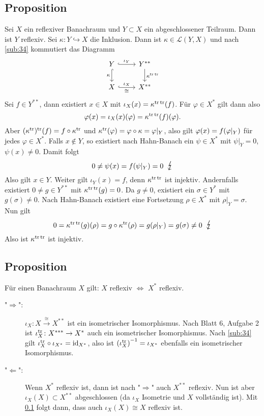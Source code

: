 \subsection[Proposition: Abgeschlossene Unterräume von reflexiven Banachräumen sind reflexiv]{Proposition} %
\label{sub:514}
Sei $X$ ein reflexiver Banachraum und $Y \subset X$ ein abgeschlossener Teilraum. Dann ist $Y$ reflexiv.
Sei $\kappa \colon Y \hookrightarrow X$ die Inklusion. Dann ist $\kappa \in \mathcal{L}(Y,X)$ und nach \ref{sub:34} kommutiert das Diagramm
\[
	\begin{tikzcd}
		Y \rar[hook, "\iota_Y"] \dar["\kappa"', hook]& Y^{**}  \dar["\kappa^{\tr \,\tr}"] \\
		X \rar["\iota_X","\cong"', hook] & X^{**}
	\end{tikzcd}
\]
Sei $f\in Y^{**}$, dann existiert $x \in X$ mit $\iota_X(x)=\kappa^{\tr\,\tr}(f)$. Für $\varphi \in X^*$ gilt dann also
\[
	\varphi(x)=\iota_X(x)(\varphi)=\kappa^{\tr\,\tr}(f)(\varphi).
\]
Aber $(\kappa^\tr)^\tr (f) = f \circ \kappa^\tr$ und $\kappa^\tr(\varphi) = \varphi \circ \kappa = \varphi|_{Y}$, also gilt $\varphi(x)= f \enbrace*{\varphi|_Y}$ für jedes 
$\varphi \in X^*$. Falls $x \not\in Y$, so existiert nach Hahn-Banach ein $\psi \in X^*$ mit $\psi|_{Y}=0$, $\psi(x)\not= 0$. Damit folgt 
\[
	0 \not= \psi(x) = f \enbrace*{\psi|_{Y}}=0 \enspace\light
\]
Also gilt $x \in Y$. Weiter gilt $\iota_Y(x)=f$, denn $\kappa^{\tr\,\tr}$ ist injektiv. Andernfalls existiert $0 \not= g \in Y^{**}$ mit $\kappa^{\tr\,\tr}(g)=0$. 
Da $g\not= 0$, existiert ein $\sigma \in Y^*$ mit $g(\sigma) \not= 0$. Nach Hahn-Banach existiert eine Fortsetzung $\rho \in X^*$ mit $\rho|_{Y}=\sigma$. Nun gilt 
\[
	0 = \kappa^{\tr\,\tr}(g)(\rho) = g \circ \kappa^\tr(\rho)= g \enbrace*{\rho|_Y} = g(\sigma) \not= 0 \enspace \light 
\]
Also ist $\kappa^{\tr\,\tr}$ ist injektiv. \bewende

\subsection[Proposition: Für Banachräume gilt: $X$ reflexiv $\iff$ $X^*$ reflexiv]{Proposition} %
\label{sub:515}
Für einen Banachraum $X$ gilt: $X$ reflexiv $\iff$ $X^*$ reflexiv.
\begin{description}
	\item["$\Rightarrow$":] $\iota_X\colon X\xrightarrow{\cong} X^{**}$ ist ein isometrischer Isomorphismus. Nach Blatt 6, Aufgabe 2 ist $\iota_X^{\tr}\colon X^{***}\to X^*$
	auch ein isometrischer Isomorphismus. Nach \ref{sub:34} gilt  $\iota_X^{\tr} \circ \iota_{X^*}= \id_{X^{*}}$, also ist $\enbrace*{\iota_X^\tr}^{-1} = \iota_{X^*}$
	ebenfalls ein isometrischer Isomorphismus.
	\item["$\Leftarrow$":] Wenn $X^*$ reflexiv ist, dann ist nach "$\Rightarrow$" auch $X^{**}$ reflexiv. Nun ist aber $\iota_X(X) \subset X^{**}$ abgeschlossen (da 
	$\iota_X$ Isometrie und $X$ vollständig ist). Mit \ref{sub:514} folgt dann, dass auch $\iota_X(X) \cong X$ reflexiv ist.\bewende
\end{description}

